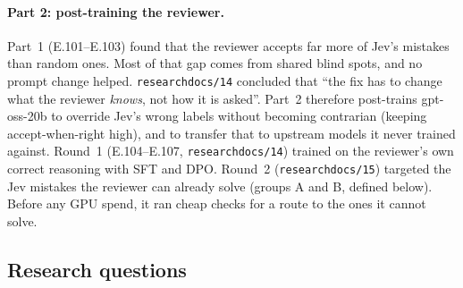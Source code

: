 \documentclass[11pt]{article}
\renewcommand{\_}{\origunderscore\allowbreak}
\begin{document}
\paragraph{Part 2: post-training the reviewer.} Part~1 (E.101--E.103) found that the reviewer accepts far more of Jev's mistakes than random ones. Most of that gap comes from shared blind spots, and no prompt change helped. \texttt{research\_docs/14} concluded that ``the fix has to change what the reviewer \emph{knows}, not how it is asked''. Part~2 therefore post-trains gpt-oss-20b to override Jev's wrong labels without becoming contrarian (keeping accept-when-right high), and to transfer that to upstream models it never trained against. Round~1 (E.104--E.107, \texttt{research\_docs/14}) trained on the reviewer's own correct reasoning with SFT and DPO. Round~2 (\texttt{research\_docs/15}) targeted the Jev mistakes the reviewer can already solve (groups A and B, defined below). Before any GPU spend, it ran cheap checks for a route to the ones it cannot solve.

\subsection{Research questions}\label{sec:rq}
\end{document}
